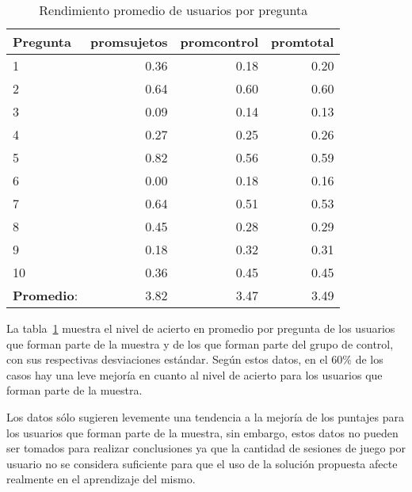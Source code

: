 \begin{table}[!hbt]
\centering
\begin{tabular}{lrrr}
\toprule
\textbf{Pregunta} & 
\textbf{promsujetos} & 
\textbf{promcontrol} & 
\textbf{promtotal} \\ 
\midrule
1         & 0.36 & 0.18 & 0.20 \\
2         & 0.64 & 0.60 & 0.60 \\
3         & 0.09 & 0.14 & 0.13 \\
4         & 0.27 & 0.25 & 0.26 \\
5         & 0.82 & 0.56 & 0.59 \\
6         & 0.00 & 0.18 & 0.16 \\
7         & 0.64 & 0.51 & 0.53 \\
8         & 0.45 & 0.28 & 0.29 \\
9         & 0.18 & 0.32 & 0.31 \\
10        & 0.36 & 0.45 & 0.45 \\
\midrule
\textbf{Promedio}: & 3.82 & 3.47 & 3.49  \\
\bottomrule
\end{tabular}
\caption{Rendimiento promedio de usuarios por pregunta}
\label{tab:objetiva_rendimiento_por_pregunta}
\end{table}

La tabla~\ref{tab:objetiva_rendimiento_por_pregunta} muestra el nivel de acierto
en promedio por pregunta de los usuarios que forman parte de la muestra y de los
que forman parte del grupo de control, con sus respectivas desviaciones
estándar. Según estos datos, en el $60\%$ de los casos hay una leve mejoría en
cuanto al nivel de acierto para los usuarios que forman parte de la muestra.

Los datos sólo sugieren levemente una tendencia a la mejoría de los puntajes
para los usuarios que forman parte de la muestra, sin embargo, estos datos no
pueden ser tomados para realizar conclusiones ya que la cantidad de sesiones de
juego por usuario no se considera suficiente para que el uso de la solución
propuesta afecte realmente en el aprendizaje del mismo.
